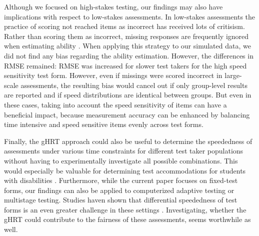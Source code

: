 \documentclass[a4paper,man,apacite,donotrepeattitle]{apa6}
\begin{document}
Although we focused on high-stakes testing, our findings may also have implications with respect to low-stakes assessments. In low-stakes assessments the practice of scoring not reached items as incorrect has received lots of critisism. Rather than scoring them as incorrect, missing responses are frequently ignored when estimating ability \cite{Pohl.2013}. When applying this strategy to our simulated data, we did not find any bias regarding the ability estimation. However, the differences in RMSE remained: RMSE was increased for slower test takers for the high speed sensitivity test form. However, even if missings were scored incorrect in large-scale assessments, the resulting bias would cancel out if only group-level results are reported and if speed distributions are identical between groups. But even in these cases, taking into account the speed sensitivity of items can have a beneficial impact, because measurement accuracy can be enhanced by balancing time intensive and speed sensitive items evenly across test forms. 

Finally, the gHRT approach could also be useful to determine the speededness of assessments under various time constraints for different test taker populations without having to experimentally investigate all possible combinations. This would especially be valuable for determining test accommodations for students with disabilities \cite{Lovett.2010}. Furthermore, while the current paper focuses on fixed-test forms, our findings can also be applied to computerized adaptive testing or multistage testing. Studies haven shown that differential speededness of test forms is an even greater challenge in these settings \cite{vanderLinden.2013}. Investigating, whether the gHRT could contribute to the fairness of these assessments, seems worthwhile as well.

\begin{flushleft}

\end{flushleft}
\end{document}
